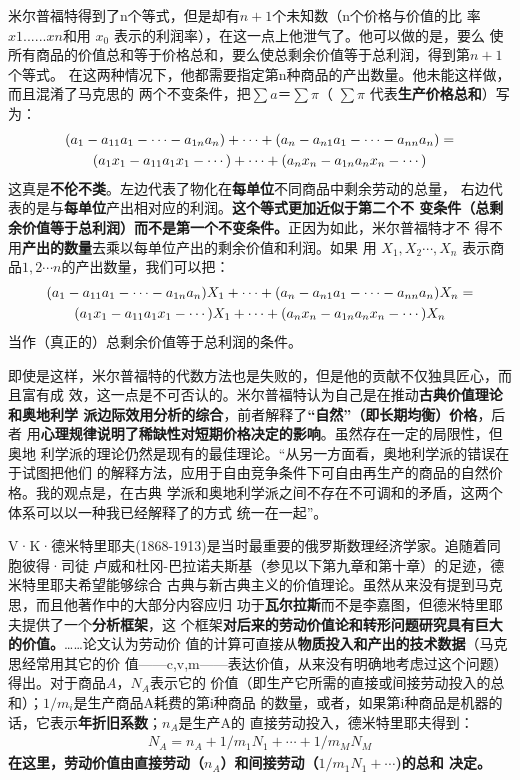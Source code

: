 米尔普福特得到了n个等式，但是却有$n+1$个未知数（n个价格与价值的比
率 $x1......xn$和用 $x_0$ 表示的利润率），在这一点上他泄气了。他可以做的是，要么
使所有商品的价值总和等于价格总和，要么使总剩余价值等于总利润，得到第$n+1$个等式。
在这两种情况下，他都需要指定第n种商品的产出数量。他未能这样做，而且混淆了马克思的
两个不变条件，把$\sum a＝\sum \pi $（ $\sum \pi $ 代表\textbf{生产价格总和}）写
为：
\begin{gather}
  (a_1 - a_{11}a_1 - \cdots - a_{1n}a_n) + \cdots + (a_n - a_{n1}a_1 - \cdots -
  a_{nn}a_n) = \notag \\
  (a_1x_1 - a_{11}a_1x_1 - \cdots) + \cdots + (a_nx_n - a_{1n}a_nx_n - \cdots)
\end{gather}
这真是\textbf{不伦不类}。左边代表了物化在\textbf{每单位}不同商品中剩余劳动的总量，
右边代表的是与\textbf{每单位}产出相对应的利润。\textbf{这个等式更加近似于第二个不
  变条件（总剩余价值等于总利润）而不是第一个不变条件。}正因为如此，米尔普福特才不
得不用\textbf{产出的数量}去乘以每单位产出的剩余价值和利润。如果
用 $X_1,X_2\cdots, X_n$ 表示商品$1,2 \cdots n$的产出数量，我们可以把：
\begin{gather}
  (a_1 - a_{11}a_1 - \cdots - a_{1n}a_n)X_1 + \cdots + (a_n - a_{n1}a_1 - \cdots -
  a_{nn}a_n)X_n = \notag \\
  (a_1x_1 - a_{11}a_1x_1 - \cdots)X_1 + \cdots + (a_nx_n - a_{1n}a_nx_n - \cdots)X_n
  \end{gather}
当作（真正的）总剩余价值等于总利润的条件。

即使是这样，米尔普福特的代数方法也是失败的，但是他的贡献不仅独具匠心，而且富有成
效，这一点是不可否认的。米尔普福特认为自己是在推动\textbf{古典价值理论和奥地利学
  派边际效用分析的综合}，前者解释了\textbf{“自然”（即长期均衡）价格}，后者
用\textbf{心理规律说明了稀缺性对短期价格决定的影响}。虽然存在一定的局限性，但奥地
利学派的理论仍然是现有的最佳理论。“从另一方面看，奥地利学派的错误在于试图把他们
的解释方法，应用于自由竞争条件下可自由再生产的商品的自然价格。我的观点是，在古典
学派和奥地利学派之间不存在不可调和的矛盾，这两个体系可以以一种我已经解释了的方式
统一在一起”。

V·K·德米特里耶夫(1868-1913)是当时最重要的俄罗斯数理经济学家。追随着同胞彼得·司徒
卢威和杜冈-巴拉诺夫斯基（参见以下第九章和第十章）的足迹，德米特里耶夫希望能够综合
古典与新古典主义的价值理论。虽然从来没有提到马克思，而且他著作中的大部分内容应归
功于\textbf{瓦尔拉斯}而不是李嘉图，但德米特里耶夫提供了一个\textbf{分析框架}，这
个框架\textbf{对后来的劳动价值论和转形问题研究具有巨大的价值。}……论文认为劳动价
值的计算可直接从\textbf{物质投入和产出的技术数据}（马克思经常用其它的价
值——c,v,m——表达价值，从来没有明确地考虑过这个问题）得出。对于商品$A$，$N_A$表示它的
价值（即生产它所需的直接或间接劳动投入的总和）；$1/m_i$是生产商品A耗费的第i种商品
的数量，或者，如果第i种商品是机器的话，它表示\textbf{年折旧系数}；$n_A$是生产A的
直接劳动投入，德米特里耶夫得到：
\begin{gather}
  N_A = n_A + 1/m_1 N_1 + \cdots + 1/m_MN_M
\end{gather}
\textbf{在这里，劳动价值由直接劳动（$n_A$）和间接劳动（$1/m_1 N_1+\cdots$)的总和
  决定。}

